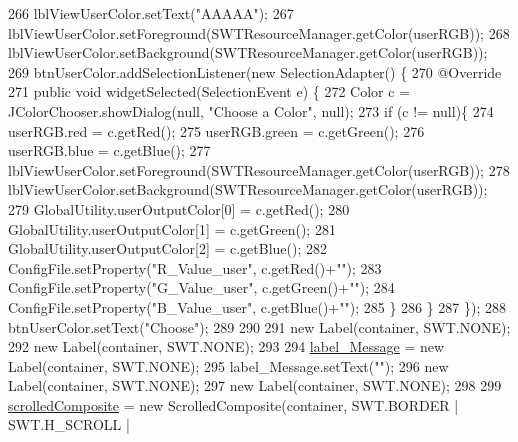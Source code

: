 \begin{DoxyCode}
266         lblViewUserColor.setText(\textcolor{stringliteral}{"AAAAA"});
267         lblViewUserColor.setForeground(SWTResourceManager.getColor(userRGB));
268         lblViewUserColor.setBackground(SWTResourceManager.getColor(userRGB));
269         btnUserColor.addSelectionListener(\textcolor{keyword}{new} SelectionAdapter() \{
270             @Override
271             \textcolor{keyword}{public} \textcolor{keywordtype}{void} widgetSelected(SelectionEvent e) \{
272                 Color c = JColorChooser.showDialog(null, \textcolor{stringliteral}{"Choose a Color"}, null);
273                   \textcolor{keywordflow}{if} (c != null)\{
274                       userRGB.red = c.getRed();
275                       userRGB.green = c.getGreen();
276                       userRGB.blue = c.getBlue();
277                       lblViewUserColor.setForeground(SWTResourceManager.getColor(userRGB));
278                       lblViewUserColor.setBackground(SWTResourceManager.getColor(userRGB));
279                       GlobalUtility.userOutputColor[0] = c.getRed();
280                       GlobalUtility.userOutputColor[1] = c.getGreen();
281                       GlobalUtility.userOutputColor[2] = c.getBlue();
282                       ConfigFile.setProperty(\textcolor{stringliteral}{"R\_Value\_user"}, c.getRed()+\textcolor{stringliteral}{""});
283                       ConfigFile.setProperty(\textcolor{stringliteral}{"G\_Value\_user"}, c.getGreen()+\textcolor{stringliteral}{""});
284                       ConfigFile.setProperty(\textcolor{stringliteral}{"B\_Value\_user"}, c.getBlue()+\textcolor{stringliteral}{""});
285                   \}
286             \}
287         \});
288         btnUserColor.setText(\textcolor{stringliteral}{"Choose"});
289         
290         
291         \textcolor{keyword}{new} Label(container, SWT.NONE);
292         \textcolor{keyword}{new} Label(container, SWT.NONE);
293         
294         \hyperlink{classit_1_1isislab_1_1masonhelperdocumentation_1_1mason_1_1wizards_1_1_b___project_information_page_a92c697e221a10de24614780a6bdb2d3a}{label\_Message} = \textcolor{keyword}{new} Label(container, SWT.NONE);
295         label\_Message.setText(\textcolor{stringliteral}{""});
296         \textcolor{keyword}{new} Label(container, SWT.NONE);
297         \textcolor{keyword}{new} Label(container, SWT.NONE);
298         
299         \hyperlink{classit_1_1isislab_1_1masonhelperdocumentation_1_1mason_1_1wizards_1_1_b___project_information_page_aefd8edc54e474960b861b1071734298d}{scrolledComposite} = \textcolor{keyword}{new} ScrolledComposite(container, SWT.BORDER | SWT.H\_SCROLL | 

\end{DoxyCode}
